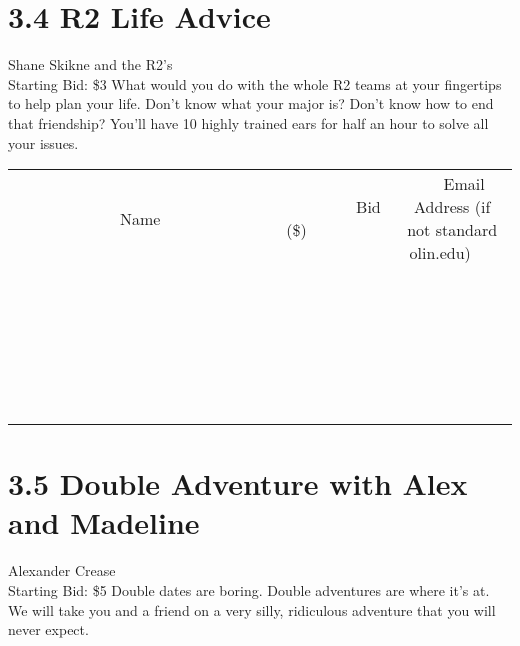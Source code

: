 \documentclass[11pt]{article}
\begin{document}
\section*{3.4 R2 Life Advice}
Shane Skikne and the R2's
\\
Starting Bid: \$3
\newline
What would you do with the whole R2 teams at your fingertips to help plan your life. Don't know what your major is? Don't know how to end that friendship? You'll have 10 highly trained ears for half an hour to solve all your issues.
\\[6ex]
\begin{tabular}{c c c}
~~~~~~~~~~~~~Name~~~~~~~~~~~~~ & ~~~~~~~~~Bid (\$)~~~~~~~~~  & ~~~Email Address (if not standard olin.edu)~~~\\
 & & \\
\hline
 & & \\
\hline
 & & \\
\hline
 & & \\
\hline
 & & \\
\hline
 & & \\
\hline
 & & \\
\hline
 & & \\
\hline
 & & \\
\hline
 & & \\
\hline
 & & \\
\hline
 & & \\
\hline
 & & \\
\hline
 & & \\
\hline
 & & \\
\hline
 & & \\
\hline
 & & \\
\hline
 & & \\
\hline
 & & \\
\hline
 & & \\
\hline
 & & \\
\hline
 & & \\
\hline
 & & \\
\hline
 & & \\
\hline
 & & \\
\hline
 & & \\
\hline
\end{tabular}
\newpage
\section*{3.5 Double Adventure with Alex and Madeline}
Alexander Crease
\\
Starting Bid: \$5
\newline
Double dates are boring. Double adventures are where it's at. We will take you and a friend on a very silly, ridiculous adventure that you will never expect. 
\end{document}

